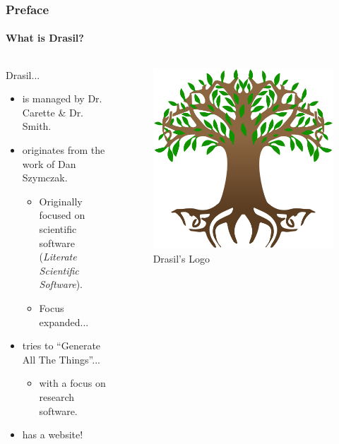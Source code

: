\documentclass{beamer}
\begin{document}
\begin{frame}
    \frametitle{Preface}
    \framesubtitle{What is Drasil?}
    \begin{columns}[T,onlytextwidth]
        \begin{column}{.5\textwidth}
            Drasil...
            \newline \newline
            \begin{minipage}{\textwidth}
                \begin{itemize}
                    \item<2-> is managed by Dr. Carette \& Dr. Smith.
                    \item<3-> originates from the work of Dan Szymczak.
                        \begin{itemize}
                            \item<4-> Originally focused on scientific software (\emph{Literate Scientific Software}).
                            \item<5-> Focus expanded...
                        \end{itemize}
                    \item<6-> tries to ``Generate All The Things''...
                    \begin{itemize}
                        \item<7-> with a focus on research software.
                    \end{itemize}
                    \item<8-> has a website\footnotemark[1]!
                \end{itemize}
            \end{minipage}
        \end{column}
        \begin{column}{.45\textwidth}
            \begin{figure}
                \includegraphics[width=.8\textwidth]{assets/drasil-logo.png}
                \caption{Drasil's Logo \tiny\cite{Drasil2021}\cite{YggdrasilWiki2021}}
            \end{figure}
        \end{column}
    \end{columns}


\end{frame}
\end{document}
